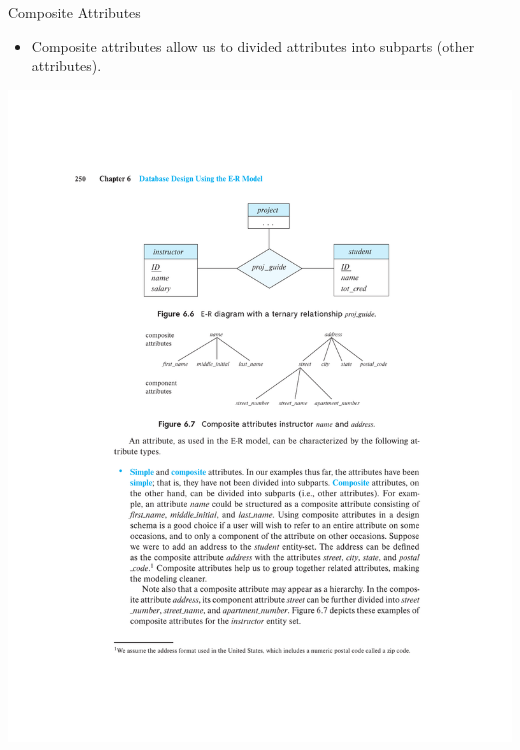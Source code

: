 \documentclass{beamer}
\begin{document}
\begin{frame}{Composite Attributes}
    \begin{itemize}
        \item Composite attributes allow us to divided attributes into subparts (other attributes).
    \end{itemize}
    \centering
    \includegraphics[trim={5cm 14cm 5cm 10cm}, clip, width=\textwidth]{figures/p250}
\end{frame}
\end{document}
